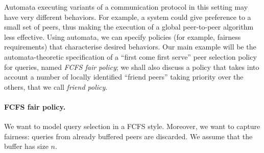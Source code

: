 Automata executing variants of a communication protocol in this setting may have very different behaviors. For example, a system could give preference to a small set of peers, thus making the execution of a global peer-to-peer algorithm less effective. Using automata, we can specify policies (for example, fairness requirements) that characterise desired behaviors.
%
Our main example will be the automata-theoretic specification of a ``first come first serve'' peer selection policy for queries, named \emph{FCFS fair policy}; we shall also discuss a policy that takes into account a number of locally identified ``friend peers'' taking priority over the others, that we call \emph{friend policy}. 



\paragraph{FCFS fair policy.}
We want to model query selection in a FCFS style. Moreover, we want to capture fairness: queries from already buffered peers are discarded. We assume that the buffer has size $n$. 


